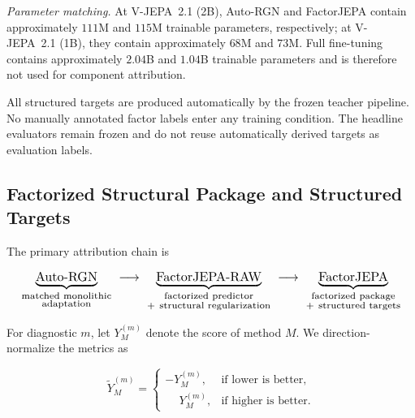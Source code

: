 \begin{table}[t]
\begin{tabularx}{\textwidth}{
    p{}
    p{}
    p{}
    p{}
    p{}
    X
}
\bottomrule
\end{tabularx}

\vspace{2pt}
\parbox{0.97\textwidth}{
\textit{Parameter matching.}
At V-JEPA~2.1 (2B), Auto-RGN and FactorJEPA contain approximately \(111\)M
and \(115\)M trainable parameters, respectively; at V-JEPA~2.1 (1B), they contain
approximately \(68\)M and \(73\)M. Full fine-tuning contains
approximately \(2.04\)B and \(1.04\)B trainable parameters and is
therefore not used for component attribution.
}
\end{table}

All structured targets are produced automatically by the frozen
teacher pipeline. No manually annotated factor labels enter any
training condition. The headline evaluators remain frozen and do not
reuse automatically derived targets as evaluation labels.


\subsection{Factorized Structural Package and Structured Targets}
\label{app:attribution_primary}

The primary attribution chain is

\begin{equation*}
\resizebox{0.97\columnwidth}{!}{$\displaystyle
\underbrace{\text{Auto-RGN}}_{\substack{\text{matched monolithic}\\
\text{adaptation}}}
\;\longrightarrow\;
\underbrace{\text{FactorJEPA-RAW}}_{\substack{\text{factorized predictor}\\
+\ \text{structural regularization}}}
\;\longrightarrow\;
\underbrace{\text{FactorJEPA}}_{\substack{\text{factorized package}\\
+\ \text{structured targets}}}
$}
\end{equation*}

For diagnostic \(m\), let \(Y_M^{(m)}\) denote the score of method
\(M\). We direction-normalize the metrics as

\begin{equation*}
\widetilde Y_M^{(m)}
=
\begin{cases}
-Y_M^{(m)}, & \text{if lower is better},\\
\phantom{-}Y_M^{(m)}, & \text{if higher is better}.
\end{cases}
\end{equation*}

